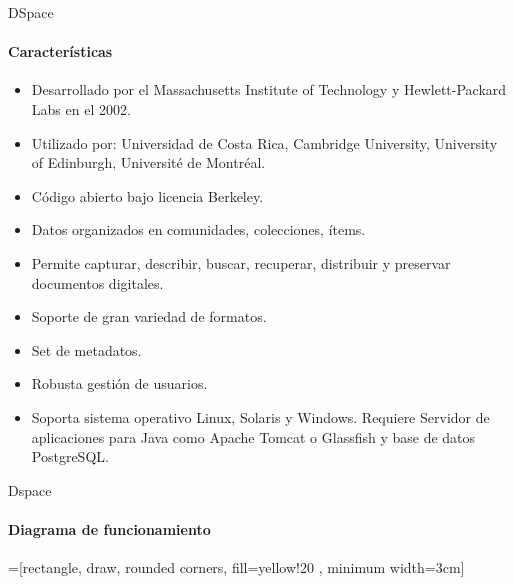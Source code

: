 \documentclass[10pt]{beamer}
\begin{document}
\begin{frame}{DSpace}
  \framesubtitle{Características}
  \begin{itemize}
  \item Desarrollado por  el Massachusetts Institute of Technology y  Hewlett-Packard Labs en el
    2002.
  \item Utilizado por: Universidad de Costa Rica, Cambridge University, University of Edinburgh,
    Université de Montréal.
  \item Código abierto bajo licencia Berkeley.
  \item Datos organizados en comunidades, colecciones, ítems.
  \item  Permite  capturar, describir,  buscar,  recuperar,  distribuir y  preservar  documentos
    digitales.
  \item Soporte de gran variedad de formatos.
  \item Set de metadatos.
  \item Robusta gestión de usuarios.
  \item Soporta  sistema operativo Linux, Solaris  y Windows. Requiere Servidor  de aplicaciones
    para Java como Apache Tomcat o Glassfish y base de datos PostgreSQL.
  \end{itemize}

\end{frame}


\begin{frame}{Dspace}
  \framesubtitle{Diagrama de funcionamiento}

  =[rectangle, draw, rounded corners, fill=yellow!20 , minimum width=3cm]
  \begin{figure}[H]
    \centering
  \end{figure}
\end{frame}
\end{document}
